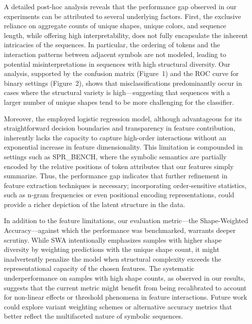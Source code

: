 \documentclass{article}
\begin{document}
A detailed post-hoc analysis reveals that the performance gap observed in our experiments can be attributed to several underlying factors. First, the exclusive reliance on aggregate counts of unique shapes, unique colors, and sequence length, while offering high interpretability, does not fully encapsulate the inherent intricacies of the sequences. In particular, the ordering of tokens and the interaction patterns between adjacent symbols are not modeled, leading to potential misinterpretations in sequences with high structural diversity. Our analysis, supported by the confusion matrix (Figure~1) and the ROC curve for binary settings (Figure~2), shows that misclassifications predominantly occur in cases where the structural variety is high—suggesting that sequences with a larger number of unique shapes tend to be more challenging for the classifier.

Moreover, the employed logistic regression model, although advantageous for its straightforward decision boundaries and transparency in feature contribution, inherently lacks the capacity to capture high-order interactions without an exponential increase in feature dimensionality. This limitation is compounded in settings such as SPR\_BENCH, where the symbolic semantics are partially encoded by the relative positions of token attributes that our features simply summarize. Thus, the performance gap indicates that further refinement in feature extraction techniques is necessary; incorporating order-sensitive statistics, such as n-gram frequencies or even positional encoding representations, could provide a richer depiction of the latent structure in the data.

In addition to the feature limitations, our evaluation metric—the Shape-Weighted Accuracy—against which the performance was benchmarked, warrants deeper scrutiny. While SWA intentionally emphasizes samples with higher shape diversity by weighting predictions with the unique shape count, it might inadvertently penalize the model when structural complexity exceeds the representational capacity of the chosen features. The systematic underperformance on samples with high shape counts, as observed in our results, suggests that the current metric might benefit from being recalibrated to account for non-linear effects or threshold phenomena in feature interactions. Future work could explore variant weighting schemes or alternative accuracy metrics that better reflect the multifaceted nature of symbolic sequences.
\end{document}
